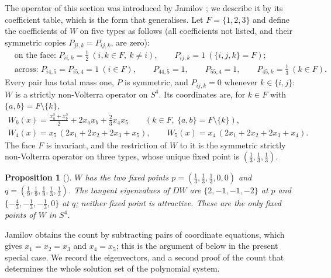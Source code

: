 \documentclass[11pt]{amsart}
\newtheorem{proposition}[theorem]{Proposition}
\theoremstyle{definition}
\begin{document}
The operator of this section was introduced by Jamilov \cite{Jam17}; we describe it by its coefficient table, which is the form that  generalises. Let $F=\{1,2,3\}$ and define the coefficients of $W$ on five types as follows (all coefficients not listed, and their symmetric copies $P_{ji,k}=P_{ij,k}$, are zero):
\begin{align*}
&\text{on the face: } P_{ii,k}=\tfrac12\ (i,k\in F,\ k\ne i),\qquad P_{ij,k}=1\ (\{i,j,k\}=F);\\
&\text{across: } P_{i4,5}=P_{i5,4}=1\ (i\in F),\qquad P_{44,5}=1,\qquad P_{55,4}=1,\qquad P_{45,k}=\tfrac13\ (k\in F).
\end{align*}
Every pair has total mass one, $P$ is symmetric, and $P_{ij,k}=0$ whenever $k\in\{i,j\}$: $W$ is a strictly non-Volterra operator on $S^4$. Its coordinates are, for $k\in F$ with $\{a,b\}=F\setminus\{k\}$,
\begin{equation}\label{eq:W}
\begin{gathered}
W_k(x)=\frac{x_a^2+x_b^2}{2}+2x_ax_b+\frac23x_4x_5\qquad(k\in F,\ \{a,b\}=F\setminus\{k\}),\\
W_4(x)=x_5\,(2x_1+2x_2+2x_3+x_5),\qquad W_5(x)=x_4\,(2x_1+2x_2+2x_3+x_4).
\end{gathered}
\end{equation}
The face $F$ is invariant, and the restriction of $W$ to it is the symmetric strictly non-Volterra operator on three types, whose unique fixed point is $(\frac13,\frac13,\frac13)$.

\begin{proposition}[{\cite[Theorem 3]{Jam17}}]\label{prop:five}
$W$ has the two fixed points $p=(\frac13,\frac13,\frac13,0,0)$ and $q=(\frac19,\frac19,\frac19,\frac13,\frac13)$. The tangent eigenvalues of $DW$ are $\{2,-1,-1,-2\}$ at $p$ and $\{-\frac43,-\frac13,-\frac13,0\}$ at $q$; neither fixed point is attractive. These are the only fixed points of $W$ in $S^4$.
\end{proposition}

Jamilov \cite{Jam17} obtains the count by subtracting pairs of coordinate equations, which gives $x_1=x_2=x_3$ and $x_4=x_5$; this is the argument of  below in the present special case. We record the eigenvectors, and a second proof of the count that determines the whole solution set of the polynomial system.
\end{document}
